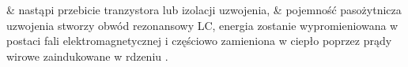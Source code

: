 \begin{easylist}
	& nastąpi przebicie tranzystora lub izolacji uzwojenia,
	& pojemność pasożytnicza uzwojenia stworzy obwód rezonansowy LC, energia zostanie wypromieniowana w postaci fali elektromagnetycznej i częściowo zamieniona w ciepło poprzez prądy wirowe zaindukowane w rdzeniu \cite{przepiorkowski}.
	\\
\end{easylist}





\clearpage




